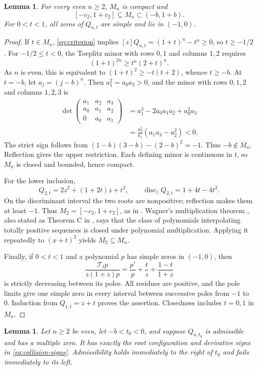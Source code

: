 \documentclass[11pt]{article}
\newtheorem{lemma}[theorem]{Lemma}
\theoremstyle{remark}
\newcommand{\T}{\mathcal{T}}
\DeclareMathOperator{\disc}{disc}
\begin{document}
\begin{lemma}\label{lem:bounds}
For every even $n\ge2$, $M_n$ is compact and
\[
 [-c_2,1+c_2]\subseteq M_n\subset(-b,1+b).
\]
For $0<t<1$, all zeros of $Q_{n,t}$ are simple and lie in $(-1,0)$.
\end{lemma}

\begin{proof}
If $t\in M_n$, \eqref{eq:criterion} implies
$[z]Q_{n,t}=(1+t)^n-t^n\ge0$, so $t\ge-1/2$.
For $-1/2\le t<0$, the Toeplitz minor with rows $0,1$ and columns $1,2$
requires
\[
 (1+t)^{2n}\ge t^n(2+t)^n.
\]
As $n$ is even, this is equivalent to
$(1+t)^2\ge-t(t+2)$, whence $t\ge-b$.
At $t=-b$, let $a_j=(j-b)^n$. Then $a_1^2=a_0a_2>0$, and the
minor with rows $0,1,2$ and columns $1,2,3$ is
\begin{align*}
 \det\begin{pmatrix}a_1&a_2&a_3\\a_0&a_1&a_2\\0&a_0&a_1\end{pmatrix}
 &=a_1^3-2a_0a_1a_2+a_0^2a_3\\
 &=\frac{a_0^2}{a_1}(a_1a_3-a_2^2)<0.
\end{align*}
The strict sign follows from
$(1-b)(3-b)-(2-b)^2=-1$. Thus $-b\notin M_n$.
Reflection gives the upper restriction. Each defining minor is continuous
in $t$, so $M_n$ is closed and bounded, hence compact.

For the lower inclusion,
\[
 Q_{2,t}=2z^2+(1+2t)z+t^2,\qquad
 \disc_zQ_{2,t}=1+4t-4t^2.
\]
On the discriminant interval the two roots are nonpositive; reflection
makes them at least $-1$. Thus
$M_2=[-c_2,1+c_2]$, as in \cite[Example 5.3]{Vishnyakova2026}.
Wagner's multiplication theorem \cite{Wagner1992}, also stated as
Theorem C in \cite{Vishnyakova2026}, says that the class of polynomials
interpolating totally positive sequences is closed under polynomial
multiplication. Applying it repeatedly to $(x+t)^2$ yields $M_2\subseteq M_n$.

Finally, if $0<t<1$ and a polynomial $p$ has simple zeros in $(-1,0)$,
then
\[
 \frac{\T_tp}{z(1+z)p}=\frac{p'}p+\frac t z+\frac{1-t}{1+z}
\]
is strictly decreasing between its poles. All residues are positive,
and the pole limits give one simple zero in every interval between
successive poles from $-1$ to $0$. Induction from $Q_{1,t}=z+t$ proves
the assertion. Closedness includes $t=0,1$ in $M_n$.
\end{proof}

\begin{lemma}\label{lem:collision}
Let $n\ge2$ be even, let $-b<t_0<0$, and suppose $Q_{n,t_0}$ is
admissible and has a multiple zero. It has exactly the root configuration
and derivative signs in \eqref{eq:collision-signs}. Admissibility holds
immediately to the right of $t_0$ and fails immediately to its left.
\end{lemma}
\end{document}
